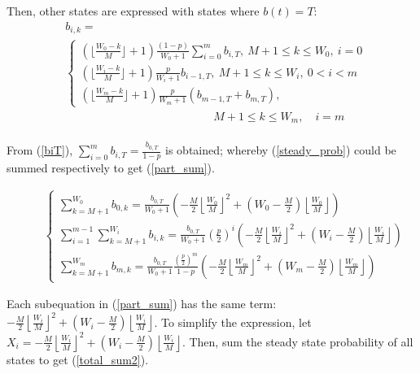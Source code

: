 \documentclass[journal]{IEEEtran}
\begin{document}
Then, other states are expressed with states where $b(t)=T$:
\begin{align}
&b_{i,k} =  \nonumber \\
&
\begin{cases}
(\lfloor \frac{W_0-k}{M} \rfloor+1)\frac{(1-p)}{W_0+1}\sum_{i=0}^m b_{i,T}, \  M+1\leq k\leq W_0,\ i = 0\\[3pt]
(\lfloor \frac{W_i-k}{M} \rfloor+1)\frac{p}{W_i+1}b_{i-1,T}, 				\	 M+1 \leq k\leq W_i, \ 0<i<m \\[3pt]
(\lfloor \frac{W_m-k}{M} \rfloor+1)\frac{p}{W_m+1} (b_{m-1,T}+b_{m,T}), 	
\end{cases}\nonumber
\\ &\qquad \qquad \qquad \qquad \quad \qquad \qquad M+1 \leq k\leq W_m, \quad i = m \nonumber \\
\label{steady_prob}
\end{align}

From (\ref{biT}), $\sum_{i=0}^m b_{i,T}= \frac{b_{0,T}}{1-p}$ is obtained; whereby (\ref{steady_prob}) could be summed respectively to get (\ref{part_sum}).  

\begin{figure}[!t]
\begin{align}
\begin{cases}
\sum_{k=M+1}^{W_0} b_{0,k} = \frac{b_{0,T}}{W_0+1}\left(-\frac{M}{2}\left\lfloor \frac{W_0}{M}\right\rfloor ^2 + \left(W_0-\frac{M}{2}\right)\left\lfloor \frac{W_0}{M} \right\rfloor \right) \\[8pt]
\sum_{i=1}^{m-1}\sum_{k=M+1}^{W_i} b_{i,k} = \frac{b_{0,T}}{W_0+1}\left(\frac{p}{2}\right)^i \left(-\frac{M}{2}\left\lfloor \frac{W_i}{M}\right\rfloor ^2 + \left(W_i-\frac{M}{2}\right)\left\lfloor \frac{W_i}{M} \right\rfloor \right) \\[8pt]
\sum_{k=M+1}^{W_m} b_{m,k} = \frac{b_{0,T}}{W_0+1}\frac{(\frac{p}{2})^m}{1-p}\left(-\frac{M}{2}\left\lfloor \frac{W_m}{M}\right\rfloor ^2 + \left(W_m-\frac{M}{2}\right)\left\lfloor \frac{W_m}{M} \right\rfloor \right) 
\end{cases}
\label{part_sum}
\end{align}
\end{figure}

Each subequation in (\ref{part_sum}) has the same term: $-\frac{M}{2}\left\lfloor \frac{W_i}{M}\right\rfloor ^2 + \left(W_i-\frac{M}{2}\right)\left\lfloor \frac{W_i}{M} \right\rfloor$. 
To simplify the expression, let $X_i = -\frac{M}{2}\left\lfloor \frac{W_i}{M}\right\rfloor ^2 + \left(W_i-\frac{M}{2}\right)\left\lfloor \frac{W_i}{M} \right\rfloor$. 
Then, sum the steady state probability of all states to get (\ref{total_sum2}).
\end{document}
